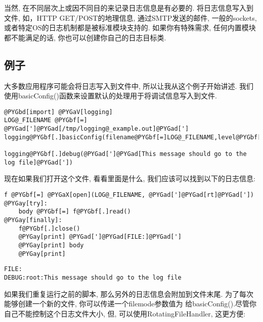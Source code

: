 \documentclass[letterpaper,10pt,english]{manual}
\begin{document}
当然, 在不同层次上或因不同目的来记录日志信息是有必要的. 将日志信息写入到文件, 如，HTTP GET/POST的地理信息, 通过SMTP发送的邮件, 一般的sockets, 或者特定OS的日志机制都是被标准模块支持的. 如果你有特殊需求, 任何内置模块都不能满足的话, 你也可以创建你自己的日志目标类.


\subsection{例子}

大多数应用程序可能会将日志写入到文件中, 所以让我从这个例子开始讲述. 我们使用basicConfig()函数来设置默认的处理用于将调试信息写入到文件.

\begin{Verbatim}[commandchars=@\[\]]
@PYGbd[import] @PYGaV[logging]
LOG@_FILENAME @PYGbf[=] @PYGad[']@PYGad[/tmp/logging@_example.out]@PYGad[']
logging@PYGbf[.]basicConfig(filename@PYGbf[=]LOG@_FILENAME,level@PYGbf[=]logging@PYGbf[.]DEBUG,)

logging@PYGbf[.]debug(@PYGad[']@PYGad[This message should go to the log file]@PYGad['])
\end{Verbatim}

现在如果我们打开这个文件, 看看里面是什么, 我们应该可以找到以下的日志信息:

\begin{Verbatim}[commandchars=@\[\]]
f @PYGbf[=] @PYGaX[open](LOG@_FILENAME, @PYGad[']@PYGad[rt]@PYGad['])
@PYGay[try]:
    body @PYGbf[=] f@PYGbf[.]read()
@PYGay[finally]:
    f@PYGbf[.]close()
    @PYGay[print] @PYGad[']@PYGad[FILE:]@PYGad[']
    @PYGay[print] body
    @PYGay[print]
\end{Verbatim}

\begin{Verbatim}[commandchars=@\[\]]
FILE:
DEBUG:root:This message should go to the log file
\end{Verbatim}

如果我们重复运行之前的脚本, 那么另外的日志信息会附加到文件末尾. 为了每次能够创建一个新的文件, 你可以传递一个filemode参数值为  给basicConfig().尽管你自己不能控制这个日志文件大小, 但, 可以使用RotatingFileHandler, 这更方便:
\end{document}
